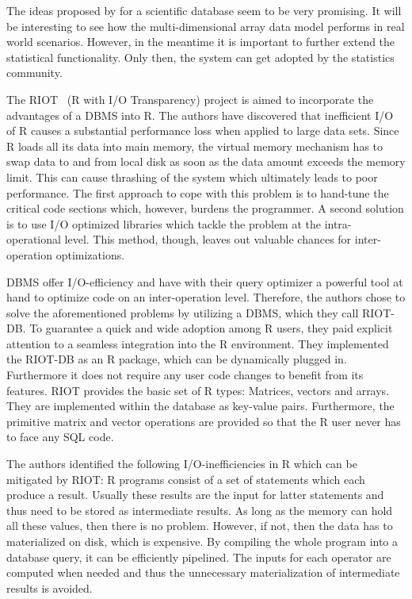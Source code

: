The ideas proposed by \citeauthor{stonebraker:2009a} for a scientific database seem to be very promising.
It will be interesting to see how the multi-dimensional array data model performs in real world scenarios.
However, in the meantime it is important to further extend the statistical functionality.
Only then, the system can get adopted by the statistics community.

The RIOT~\cite{zhang:apa2009a} (R with I/O Transparency) project is aimed to incorporate the advantages of a DBMS into R.
The authors \citeauthor{zhang:apa2009a} have discovered that inefficient I/O of R causes a substantial performance loss when applied to large data sets.
Since R loads all its data into main memory, the virtual memory mechanism has to swap data to and from local disk as soon as the data amount exceeds the memory limit.
This can cause thrashing of the system which ultimately leads to poor performance.
The first approach to cope with this problem is to hand-tune the critical code sections which, however, burdens the programmer.
A second solution is to use I/O optimized libraries which tackle the problem at the intra-operational level.
This method, though, leaves out valuable chances for inter-operation optimizations.

DBMS offer I/O-efficiency and have with their query optimizer a powerful tool at hand to optimize code on an inter-operation level.
Therefore, the authors chose to solve the aforementioned problems by utilizing a DBMS, which they call RIOT-DB.
To guarantee a quick and wide adoption among R users, they paid explicit attention to a seamless integration into the R environment.
They implemented the RIOT-DB as an R package, which can be dynamically plugged in.
Furthermore it does not require any user code changes to benefit from its features.
RIOT provides the basic set of R types: Matrices, vectors and arrays.
They are implemented within the database as key-value pairs.
Furthermore, the primitive matrix and vector operations are provided so that the R user never has to face any SQL code.

The authors identified the following I/O-inefficiencies in R which can be mitigated by RIOT:
R programs consist of a set of statements which each produce a result.
Usually these results are the input for latter statements and thus need to be stored as intermediate results.
As long as the memory can hold all these values, then there is no problem.
However, if not, then the data has to materialized on disk, which is expensive.
By compiling the whole program into a database query, it can be efficiently pipelined.
The inputs for each operator are computed when needed and thus the unnecessary materialization of intermediate results is avoided.

